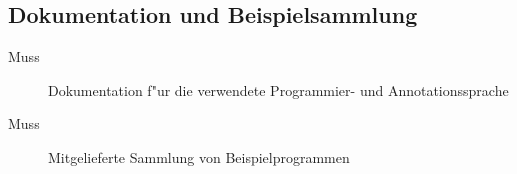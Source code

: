 \subsection{Dokumentation und Beispielsammlung}%

\begin{description}%
    \item [Muss] Dokumentation f"ur die verwendete Programmier- und Annotationssprache%
    \item [Muss] Mitgelieferte Sammlung von Beispielprogrammen%
\end{description}%

